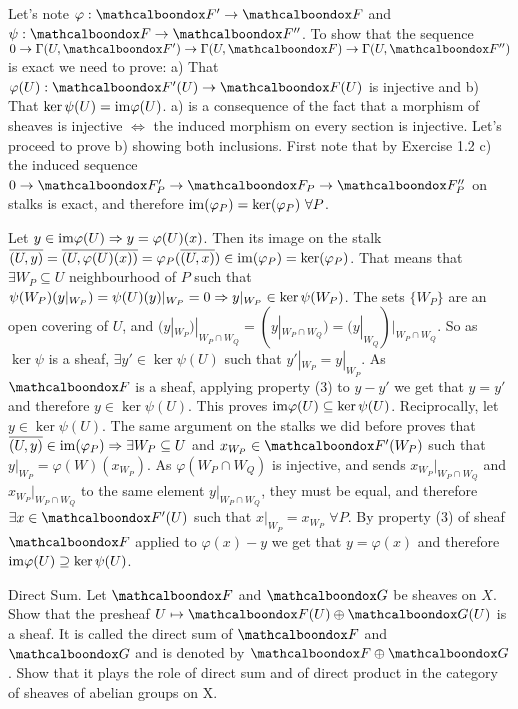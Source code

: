 \begin{sol}
	Let's note $\varphi: \sF' \to \sF$ and $\psi: \sF \to \sF''$. To show that the sequence $0 \to \Gamma(U,\sF') \to \Gamma(U, \sF) \to \Gamma(U, \sF'')$ is exact we need to prove: a) That $\varphi(U): \sF'(U) \to \sF(U)$ is injective and b) That $\ker \psi(U) = \mathrm{im} \varphi(U)$. a) is a consequence of the fact that a morphism of sheaves is injective $\iff$ the induced morphism on every section is injective. Let's proceed to prove b) showing both inclusions. First note that by Exercise 1.2 c) the induced sequence $0 \to \sF'_P \to \sF_P \to \sF''_P$ on stalks is exact, and therefore $\mathrm{im} (\varphi_P) = \ker (\varphi_P) \, \, \forall P$. 

	Let $y \in \mathrm{im} \varphi(U) \Rightarrow y = \varphi(U)(x)$. Then its image on the stalk $\overline{(U,y)} = \overline{(U, \varphi(U)(x))} = \varphi_P(\overline{(U,x)}) \in \mathrm{im} (\varphi_P) = \ker (\varphi_P)$. That means that $\exists W_P \subseteq U$ neighbourhood of $P$ such that $\psi(W_P)(y|_{W_P}) = \psi(U)(y)|_{W_P} = 0 \Rightarrow y|_{W_P} \in \ker \psi(W_P)$. The sets $\{W_P\}$ are an open covering of $U$, and $(y|_{W_P})|_{W_P \cap W_Q} = (y|_{W_P \cap W_Q}) = (y|_{W_Q})|_{W_P \cap W_Q}$. So as $\ker \psi$ is a sheaf, $\exists y' \in \ker \psi(U)$ such that $y'|_{W_P} = y|_{W_P}$. As $\sF$ is a sheaf, applying property (3) to $y-y'$ we get that $y = y'$ and therefore $y \in \ker \psi(U)$. This proves $\mathrm{im} \varphi(U) \subseteq \ker \psi(U)$. Reciprocally, let $y \in \ker \psi(U)$. The same argument on the stalks we did before proves that $\overline{(U,y)} \in \mathrm{im} (\varphi_P) \Rightarrow \exists W_P \subseteq U$ and $x_{W_P} \in \sF'(W_P)$ such that $y|_{W_P} = \varphi(W)(x_{W_P})$. As $\varphi(W_P \cap W_Q)$ is injective, and sends $x_{W_P}|_{W_P \cap W_Q}$ and $x_{W_P}|_{W_P \cap W_Q}$ to the same element $y|_{W_P \cap W_Q}$, they must be equal, and therefore $\exists x \in \sF'(U)$ such that $x|_{W_P} = x_{W_P} \, \, \forall P$. By property (3) of sheaf $\sF$ applied to $\varphi(x)-y$ we get that $y = \varphi(x)$ and therefore $\mathrm{im} \varphi(U) \supseteq \ker \psi(U)$.
\end{sol}

\begin{ex}
	Direct Sum. Let $\sF$ and $\sG$ be sheaves on $X$. Show that the presheaf $U \mapsto \sF(U) \oplus \sG(U)$ is a sheaf. It is called the direct sum of $\sF$ and $\sG$ and is denoted by $\sF \oplus \sG$. Show that it plays the role of direct sum and of direct product in the category of sheaves of abelian groups on X.
\end{ex}

